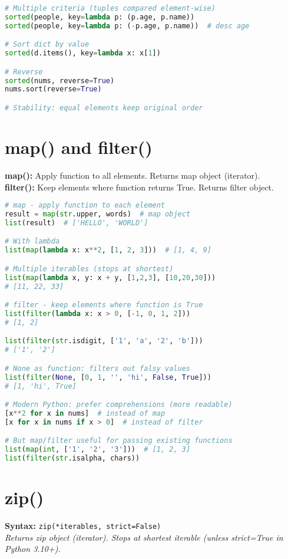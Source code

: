 \documentclass[8pt,landscape]{article}
\begin{document}
\begin{multicols}{3}
\begin{lstlisting}[language=Python]
# Multiple criteria (tuples compared element-wise)
sorted(people, key=lambda p: (p.age, p.name))
sorted(people, key=lambda p: (-p.age, p.name))  # desc age

# Sort dict by value
sorted(d.items(), key=lambda x: x[1])

# Reverse
sorted(nums, reverse=True)
nums.sort(reverse=True)

# Stability: equal elements keep original order
\end{lstlisting}

\section*{map() and filter()}
\textbf{map():} Apply function to all elements. Returns map object (iterator). \\
\textbf{filter():} Keep elements where function returns True. Returns filter object.

\begin{lstlisting}[language=Python]
# map - apply function to each element
result = map(str.upper, words)  # map object
list(result)  # ['HELLO', 'WORLD']

# With lambda
list(map(lambda x: x**2, [1, 2, 3]))  # [1, 4, 9]

# Multiple iterables (stops at shortest)
list(map(lambda x, y: x + y, [1,2,3], [10,20,30]))
# [11, 22, 33]

# filter - keep elements where function is True
list(filter(lambda x: x > 0, [-1, 0, 1, 2]))
# [1, 2]

list(filter(str.isdigit, ['1', 'a', '2', 'b']))
# ['1', '2']

# None as function: filters out falsy values
list(filter(None, [0, 1, '', 'hi', False, True]))
# [1, 'hi', True]

# Modern Python: prefer comprehensions (more readable)
[x**2 for x in nums]  # instead of map
[x for x in nums if x > 0]  # instead of filter

# But map/filter useful for passing existing functions
list(map(int, ['1', '2', '3']))  # [1, 2, 3]
list(filter(str.isalpha, chars))
\end{lstlisting}

\section*{zip()}
\textbf{Syntax:} \lstinline|zip(*iterables, strict=False)| \\
\textit{Returns zip object (iterator). Stops at shortest iterable (unless strict=True in Python 3.10+).}


\end{multicols}
\end{document}
